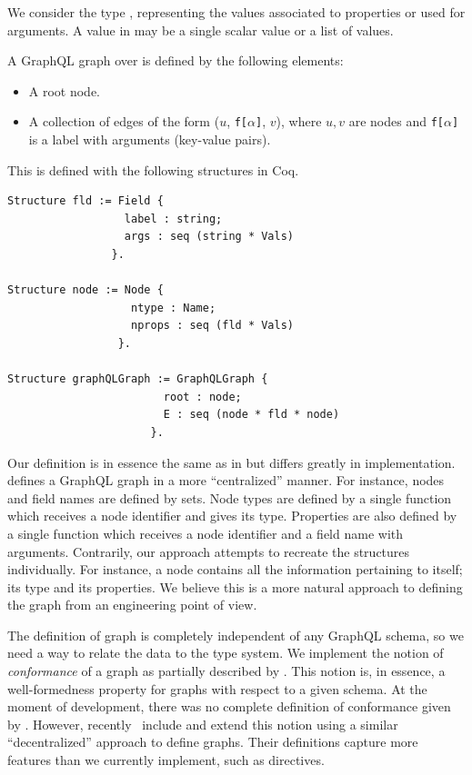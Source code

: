 We consider the type \Vals, representing the values associated to properties or used for arguments. A value in \Vals{} may be a single scalar value or a list of values.

\begin{definition}
A GraphQL graph over \Vals is defined by the following elements:
\begin{itemize}
    \item A root node.
    \item A collection of edges of the form ($u$, \texttt{f[}$\alpha$\texttt{]}, $v$), where $u, v$ are nodes and \texttt{f[}$\alpha$\texttt{]} is a label with arguments (key-value pairs).
\end{itemize}
\end{definition}

This is defined with the following structures in Coq.

\begin{verbatim}
Structure fld := Field {
                  label : string;
                  args : seq (string * Vals)
                }.

Structure node := Node {
                   ntype : Name;
                   nprops : seq (fld * Vals)
                 }.

Structure graphQLGraph := GraphQLGraph {
                        root : node;
                        E : seq (node * fld * node)
                      }.
\end{verbatim}

Our definition is in essence the same as in \HP{} but differs greatly in implementation. \HP{} defines a GraphQL graph in a more ``centralized'' manner. For instance, nodes and field names are defined by sets. Node types are defined by a single function which receives a node identifier and gives its type. Properties are also defined by a single function which receives a node identifier and a field name with arguments. Contrarily, our approach attempts to recreate the structures individually. For instance, a node contains all the information pertaining to itself; its type and its properties. We believe this is a more natural approach to defining the graph from an engineering point of view.

The definition of graph is completely independent of any GraphQL schema, so we need a way to relate the data to the type system. We implement the notion of \textit{conformance}  of a graph as partially described by \HP{}. This notion is, in essence, a well-formedness property for graphs with respect to a given schema. At the moment of development, there was no complete definition of conformance given by \HP{}. However, recently~\cite{olafschema} include and extend this notion using a similar ``decentralized'' approach to define graphs. Their definitions capture more features than we currently implement, such as directives.

